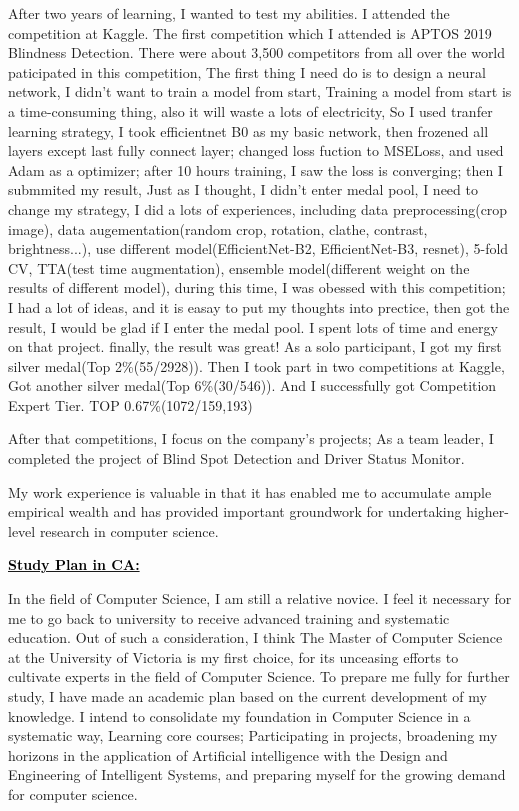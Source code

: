 \documentclass[12pt]{article}
\newcommand{\statement}[1]{\par\medskip
  \underline{\textcolor{black}{\textbf{#1:}}}\space
}
\begin{document}
\bigskip

After two years of learning, I wanted to test my abilities. I attended the competition at Kaggle. The first competition which I attended is APTOS 2019 Blindness Detection. There were about 3,500 competitors from all over the world paticipated in this competition, The first thing I need do is to design a neural network, I didn't want to train a model from start, Training a model from start is a time-consuming thing, also it will waste a lots of electricity, So I used tranfer learning strategy, I took efficientnet B0 as my basic network, then frozened all layers except last fully connect layer; changed loss fuction to MSELoss, and used Adam as a optimizer; after 10 hours training, I saw the loss is converging; then I submmited my result, Just as I thought, I didn't enter medal pool, I need to change my strategy, I did a lots of experiences, including data preprocessing(crop image), data augementation(random crop, rotation, clathe, contrast, brightness...), use different model(EfficientNet-B2, EfficientNet-B3, resnet),  5-fold CV, TTA(test time augmentation), ensemble model(different weight on the results of different model), during this time, I was obessed with this competition; I had a lot of ideas, and it is easay to put my thoughts into prectice, then got the result, I would be glad if I enter the medal pool. I spent lots of time and energy on that project. finally, the result was great! As a solo participant, I got my first silver medal(Top 2\%(55/2928)). Then I took part in two competitions at Kaggle, Got another silver medal(Top 6\%(30/546)). And I successfully got Competition Expert Tier. TOP 0.67\%(1072/159,193)

\bigskip

After that competitions, I focus on the company's projects; As a team leader, I completed the project of Blind Spot Detection and Driver Status Monitor.

\bigskip

My work experience is valuable in that it has enabled me to accumulate ample empirical wealth and has provided important groundwork for undertaking higher-level research in computer science.

\bigskip

\statement{Study Plan in CA}
In the field of Computer Science, I am still a relative novice. I feel it necessary for me to go back to university to receive advanced training and systematic education. Out of such a consideration, I think The Master of Computer Science at the University of Victoria is my first choice, for its unceasing efforts to cultivate experts in the field of Computer Science. To prepare me fully for further study, I have made an academic plan based on the current development of my knowledge. I intend to consolidate my foundation in Computer Science in a systematic way, Learning core courses; Participating in projects, broadening my horizons in the application of Artificial intelligence with the Design and Engineering of Intelligent Systems, and preparing myself for the growing demand for computer science. 
\end{document}
